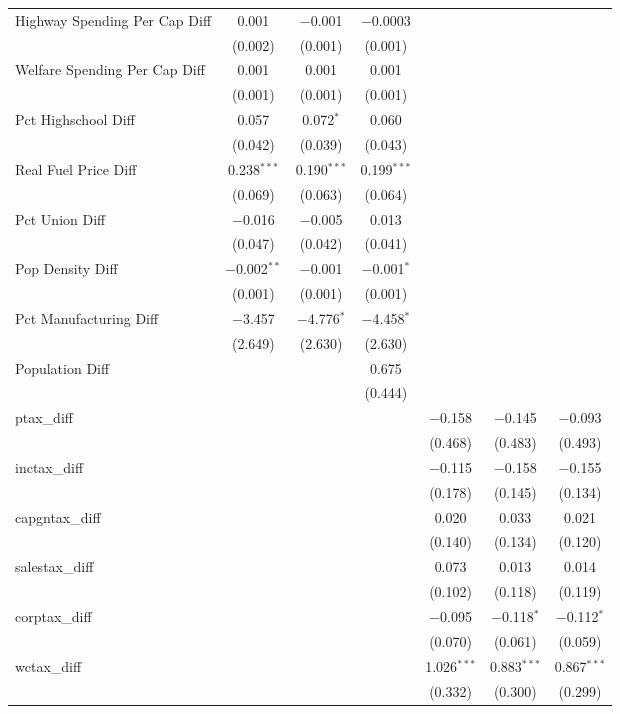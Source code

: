 \begin{table}[!htbp]
\begin{tabular}{@{\extracolsep{5pt}}lcccccc}
  Highway Spending Per Cap Diff & 0.001 & $-$0.001 & $-$0.0003 &  &  &  \\ 
  & (0.002) & (0.001) & (0.001) &  &  &  \\ 
  Welfare Spending Per Cap Diff & 0.001 & 0.001 & 0.001 &  &  &  \\ 
  & (0.001) & (0.001) & (0.001) &  &  &  \\ 
  Pct Highschool Diff & 0.057 & 0.072$^{*}$ & 0.060 &  &  &  \\ 
  & (0.042) & (0.039) & (0.043) &  &  &  \\ 
  Real Fuel Price Diff & 0.238$^{***}$ & 0.190$^{***}$ & 0.199$^{***}$ &  &  &  \\ 
  & (0.069) & (0.063) & (0.064) &  &  &  \\ 
  Pct Union Diff & $-$0.016 & $-$0.005 & 0.013 &  &  &  \\ 
  & (0.047) & (0.042) & (0.041) &  &  &  \\ 
  Pop Density Diff & $-$0.002$^{**}$ & $-$0.001 & $-$0.001$^{*}$ &  &  &  \\ 
  & (0.001) & (0.001) & (0.001) &  &  &  \\ 
  Pct Manufacturing Diff & $-$3.457 & $-$4.776$^{*}$ & $-$4.458$^{*}$ &  &  &  \\ 
  & (2.649) & (2.630) & (2.630) &  &  &  \\ 
  Population Diff &  &  & 0.675 &  &  &  \\ 
  &  &  & (0.444) &  &  &  \\ 
  ptax\_diff &  &  &  & $-$0.158 & $-$0.145 & $-$0.093 \\ 
  &  &  &  & (0.468) & (0.483) & (0.493) \\ 
  inctax\_diff &  &  &  & $-$0.115 & $-$0.158 & $-$0.155 \\ 
  &  &  &  & (0.178) & (0.145) & (0.134) \\ 
  capgntax\_diff &  &  &  & 0.020 & 0.033 & 0.021 \\ 
  &  &  &  & (0.140) & (0.134) & (0.120) \\ 
  salestax\_diff &  &  &  & 0.073 & 0.013 & 0.014 \\ 
  &  &  &  & (0.102) & (0.118) & (0.119) \\ 
  corptax\_diff &  &  &  & $-$0.095 & $-$0.118$^{*}$ & $-$0.112$^{*}$ \\ 
  &  &  &  & (0.070) & (0.061) & (0.059) \\ 
  wctax\_diff &  &  &  & 1.026$^{***}$ & 0.883$^{***}$ & 0.867$^{***}$ \\ 
  &  &  &  & (0.332) & (0.300) & (0.299) \\ 

\end{tabular}
\end{table}
